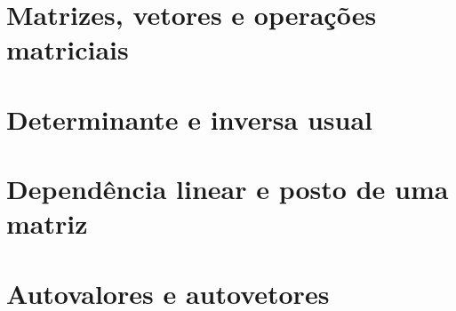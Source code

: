 
\section{Matrizes, vetores e operações matriciais}
\label{sec:matrices_revision}


\section{Determinante e inversa usual}
\label{sec:matrices_inverse}


\section{Dependência linear e posto de uma matriz}
\label{sec:matrices_li_ld}


\section{Autovalores e autovetores}
\label{sec:matrices_eigen}
